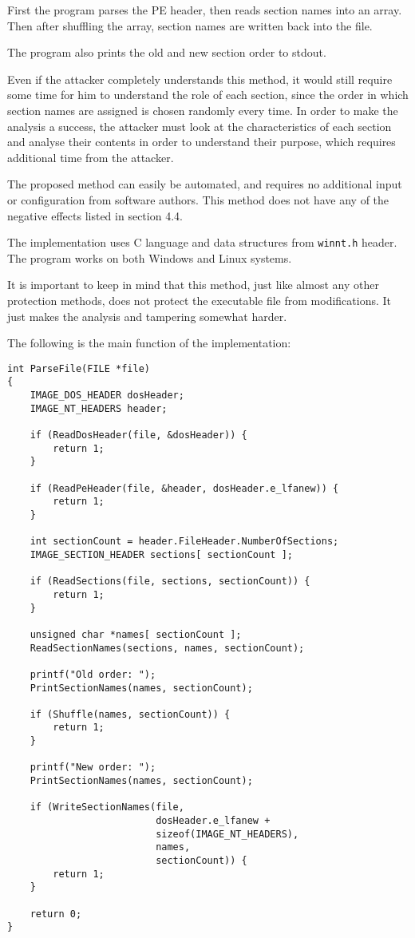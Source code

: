 \documentclass[a4paper,12pt]{article}
\begin{document}
First the program parses the PE header, then reads section names into an
array. Then after shuffling the array, section names are written back
into the file.

The program also prints the old and new section order to stdout.

Even if the attacker completely understands this method, it would still
require some time for him to understand the role of each section, since the
order in which section names are assigned is chosen randomly every time.
In order to make the analysis a success, the attacker must look at the
characteristics of each section and analyse their contents in order to
understand their purpose, which requires additional time from the attacker.

The proposed method can easily be automated, and requires no additional
input or configuration from software authors. This method does not have any
of the negative effects listed in section 4.4.

The implementation uses C language and data structures from \texttt{winnt.h}
header. The program works on both Windows and Linux systems.

It is important to keep in mind that this method, just like almost any other
protection methods, does not protect the executable file from modifications.
It just makes the analysis and tampering somewhat harder.

The following is the main function of the implementation:

\begin{verbatim}
int ParseFile(FILE *file)
{
    IMAGE_DOS_HEADER dosHeader;
    IMAGE_NT_HEADERS header;

    if (ReadDosHeader(file, &dosHeader)) {
        return 1;
    }

    if (ReadPeHeader(file, &header, dosHeader.e_lfanew)) {
        return 1;
    }

    int sectionCount = header.FileHeader.NumberOfSections;
    IMAGE_SECTION_HEADER sections[ sectionCount ];

    if (ReadSections(file, sections, sectionCount)) {
        return 1;
    }

    unsigned char *names[ sectionCount ];
    ReadSectionNames(sections, names, sectionCount);

    printf("Old order: ");
    PrintSectionNames(names, sectionCount);

    if (Shuffle(names, sectionCount)) {
        return 1;
    }

    printf("New order: ");
    PrintSectionNames(names, sectionCount);

    if (WriteSectionNames(file,
                          dosHeader.e_lfanew +
                          sizeof(IMAGE_NT_HEADERS),
                          names,
                          sectionCount)) {
        return 1;
    }

    return 0;
}
\end{verbatim}
\end{document}
